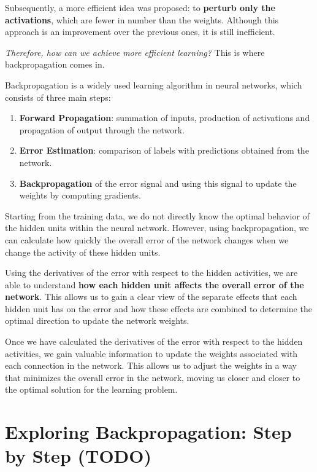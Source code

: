 Subsequently, a more efficient idea was proposed: to \textbf{perturb only the activations}, which are fewer in number than the weights. Although this approach is an improvement over the previous ones, it is still inefficient.

\textit{Therefore, how can we achieve more efficient learning?} This is where backpropagation comes in.

\begin{remark}
Backpropagation is a widely used learning algorithm in neural networks, which consists of three main steps:

\begin{enumerate}
    \item \textbf{Forward Propagation}: summation of inputs, production of activations and propagation of output through the network.

    \item \textbf{Error Estimation}: comparison of labels with predictions obtained from the network.

    \item \textbf{Backpropagation} of the error signal and using this signal to update the weights by computing gradients.
\end{enumerate}
\end{remark}

Starting from the training data, we do not directly know the optimal behavior of the hidden units within the neural network. However, using backpropagation, we can calculate how quickly the overall error of the network changes when we change the activity of these hidden units.

Using the derivatives of the error with respect to the hidden activities, we are able to understand \textbf{how each hidden unit affects the overall error of the network}. This allows us to gain a clear view of the separate effects that each hidden unit has on the error and how these effects are combined to determine the optimal direction to update the network weights.

Once we have calculated the derivatives of the error with respect to the hidden activities, we gain valuable information to update the weights associated with each connection in the network. This allows us to adjust the weights in a way that minimizes the overall error in the network, moving us closer and closer to the optimal solution for the learning problem.

\section{Exploring Backpropagation: Step by Step (TODO)}

